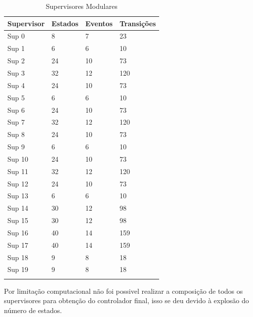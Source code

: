 \begin{table}[h]%
\begin{center}
\begin{minipage}{0.5\textwidth}
\caption{Supervisores Modulares}
\label{tab:supervisor}
\begin{tabular}{@{}llll@{}}
  \toprule
  Supervisor & Estados & Eventos & Transições\\
  \midrule
  Sup 0 & 8 & 7 & 23\\
  Sup 1 & 6 & 6 & 10\\
  Sup 2 & 24 & 10 & 73\\
  Sup 3 & 32 & 12 & 120\\
  Sup 4 & 24 & 10 & 73\\
  Sup 5 & 6 & 6 & 10\\
  Sup 6 & 24 & 10 & 73\\
  Sup 7 & 32 & 12 & 120\\
  Sup 8 & 24 & 10 & 73\\
  Sup 9 & 6 & 6 & 10\\
  Sup 10 & 24 & 10 & 73\\
  Sup 11 & 32 & 12 & 120\\
  Sup 12 & 24 & 10 & 73\\
  Sup 13 & 6 & 6 & 10\\
  Sup 14 & 30 & 12 & 98\\
  Sup 15 & 30 & 12 & 98\\
  Sup 16 & 40 & 14 & 159\\
  Sup 17 & 40 & 14 & 159\\
  Sup 18 & 9 & 8 & 18\\
  Sup 19 & 9 & 8 & 18\\
  \botrule
\end{tabular}
\end{minipage}
\end{center}
\end{table}

Por limitação computacional não foi possivel realizar a composição de todos os supervisores para obtenção do controlador final, isso se deu devido à explosão do número de estados.
